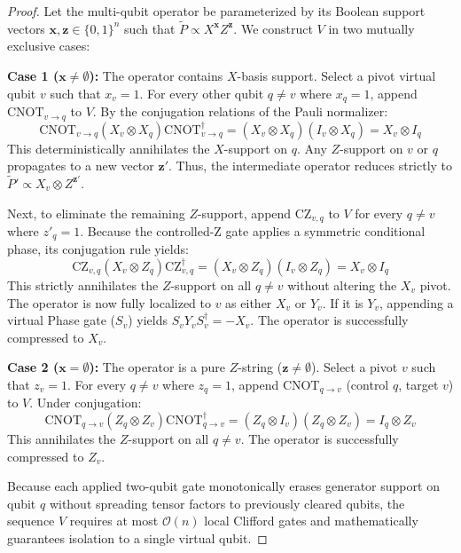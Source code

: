 \documentclass[11pt]{article}
\begin{document}
\begin{proof}
Let the multi-qubit operator be parameterized by its Boolean support vectors $\mathbf{x}, \mathbf{z} \in \{0,1\}^n$ such that $\tilde{P} \propto X^{\mathbf{x}} Z^{\mathbf{z}}$. We construct $V$ in two mutually exclusive cases:

\textbf{Case 1 ($\mathbf{x} \neq \emptyset$):} The operator contains $X$-basis support. Select a pivot virtual qubit $v$ such that $x_v = 1$. For every other qubit $q \neq v$ where $x_q = 1$, append $\text{CNOT}_{v \to q}$ to $V$. By the conjugation relations of the Pauli normalizer:
\begin{equation}
    \text{CNOT}_{v \to q} (X_v \otimes X_q) \text{CNOT}_{v \to q}^\dagger = (X_v \otimes X_q)(I_v \otimes X_q) = X_v \otimes I_q
\end{equation}
This deterministically annihilates the $X$-support on $q$. Any $Z$-support on $v$ or $q$ propagates to a new vector $\mathbf{z}'$. Thus, the intermediate operator reduces strictly to $\tilde{P}' \propto X_v \otimes Z^{\mathbf{z}'}$.

Next, to eliminate the remaining $Z$-support, append $\text{CZ}_{v, q}$ to $V$ for every $q \neq v$ where $z'_q = 1$. Because the controlled-Z gate applies a symmetric conditional phase, its conjugation rule yields:
\begin{equation}
    \text{CZ}_{v, q} (X_v \otimes Z_q) \text{CZ}_{v, q}^\dagger = (X_v \otimes Z_q)(I_v \otimes Z_q) = X_v \otimes I_q
\end{equation}
This strictly annihilates the $Z$-support on all $q \neq v$ without altering the $X_v$ pivot. The operator is now fully localized to $v$ as either $X_v$ or $Y_v$. If it is $Y_v$, appending a virtual Phase gate ($S_v$) yields $S_v Y_v S_v^\dagger = -X_v$. The operator is successfully compressed to $X_v$.

\textbf{Case 2 ($\mathbf{x} = \emptyset$):} The operator is a pure $Z$-string ($\mathbf{z} \neq \emptyset$). Select a pivot $v$ such that $z_v = 1$. For every $q \neq v$ where $z_q = 1$, append $\text{CNOT}_{q \to v}$ (control $q$, target $v$) to $V$. Under conjugation:
\begin{equation}
    \text{CNOT}_{q \to v} (Z_q \otimes Z_v) \text{CNOT}_{q \to v}^\dagger = (Z_q \otimes I_v)(Z_q \otimes Z_v) = I_q \otimes Z_v
\end{equation}
This annihilates the $Z$-support on all $q \neq v$. The operator is successfully compressed to $Z_v$.

Because each applied two-qubit gate monotonically erases generator support on qubit $q$ without spreading tensor factors to previously cleared qubits, the sequence $V$ requires at most $\mathcal{O}(n)$ local Clifford gates and mathematically guarantees isolation to a single virtual qubit.
\end{proof}
\end{document}
